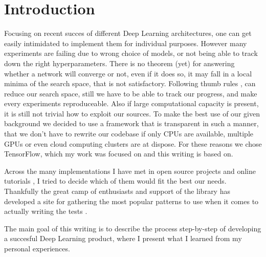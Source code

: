 \section{Introduction}

Focusing on recent succes of different Deep Learning architectures, one can get easily intimidated to implement them for individual purposes.
However many experiments are failing due to wrong choice of models, or not being able to track down the right hyperparameters.
There is no theorem (yet) for answering whether a network will converge or not, even if it does so, it may fall in a local minima of the search space, that is not satisfactory.
Following thumb rules \cite{thumbrules?}, can reduce our search space, still we have to be able to track our progress, and make every experiments reproduceable.
Also if large computational capacity is present, it is still not trivial how to exploit our sources. To make the best use of our given background we decided to use a framework that is transparent in such a manner, that we don't have to rewrite our codebase if only CPUs are available, multiple GPUs or even cloud computing clusters are at dispose. For these reasons we chose TensorFlow, which my work was focused on and this writing is based on.

Across the many implementations I have met in open source projects \cite{OSS?} and online tutorials \cite{wildml - metaflow - etc}, I tried to decide which of them would fit the best our needs.
Thankfully the great camp of enthusiasts and support of the library has developed a site for gathering the most popular patterns to use when it comes to actually writing the tests \cite{tensorflow-patterns}.

The main goal of this writing is to describe the process step-by-step of developing a succesful Deep Learning product, where I present what I learned from my personal experiences.

